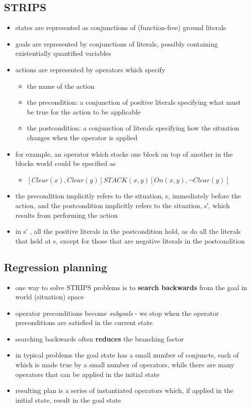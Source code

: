 \documentclass{article}
\begin{document}
\subsection{STRIPS}
\begin{itemize}
  \item states are represented as conjunctions of (function-free) ground literals 
  \item goals are represented by conjunctions of literals, possibly containing existentially quantified variables 
  \item actions are represented by operators which specify
  \begin{itemize}
    \item the name of the action
    \item the precondition: a conjunction of positive literals specifying what must be true for the action to be applicable
    \item the postcondition: a conjunction of literals specifying how the situation changes when the operator is applied
  \end{itemize}
  \item for example, an operator which stacks one block on top of another in the blocks world could be specified as
  \begin{itemize}
    \item $[Clear(x), Clear(y)] STACK(x, y) [ On(x, y), ¬Clear(y) ]$
  \end{itemize}
  \item the precondition implicitly refers to the situation, s, immediately before the action, and the postcondition implicitly refers to the situation, s′, which results from performing the action 
  \item in s′ , all the positive literals in the postcondition hold, as do all the literals that held at s, except for those that are negative literals in the postcondition
\end{itemize}

\subsection{Regression planning}
\begin{itemize}
  \item one way to solve STRIPS problems is to \textbf{search backwards} from the goal in world (situation) space 
  \item operator preconditions become \textit{subgoals} - we stop when the operator preconditions are satisfied in the current state 
  \item searching backwards often \textbf{reduces} the branching factor 
  \item in typical problems the goal state has a small number of conjuncts, each of which is made true by a small number of operators, while there are many operators that can be applied in the initial state 
  \item resulting plan is a series of instantiated operators which, if applied in the initial state, result in the goal state
\end{itemize}
\end{document}
